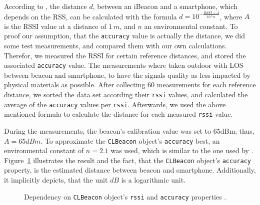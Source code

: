 According to \citet{wang:bt_pos}, the distance $d$, between an iBeacon and a smartphone, which depends on the \acl{RSS}, can be calculated with the formula $d = 10^{-\frac{RSSI + A}{10 * n}}$, where $A$ is the \acs{RSSI} value at a distance of $1~m$, and $n$ an environmental constant. To proof our assumption, that the \texttt{accuracy} value is actually the distance, we did some test measurements, and compared them with our own calculations. Therefor, we measured the \acs{RSSI} for certain reference distances, and stored the associated \texttt{accuracy} value. The measurements where taken outdoor with \ac{LOS} between beacon and smartphone, to have the signals quality as less impacted by physical materials as possible. After collecting 60 measurements for each reference distance, we sorted the data set according their \texttt{rssi} values, and calculated the average of the \texttt{accuracy} values per \texttt{rssi}. Afterwards, we used the above mentioned formula to calculate the distance for each measured \texttt{rssi} value.

During the measurements, the beacon's calibration value was set to 65dBm; thus, $A = 65dBm$. To approximate the \texttt{CLBeacon} object's \texttt{accuracy} best, an environmental constant of $n = 2.1$ was used, which is similar to the one used by \citet{wang:bt_pos}. Figure~\ref{fig:eval_accuracy_vs_distance} illustrates the result and the fact, that the \texttt{CLBeacon} object's \texttt{accuracy} property, is the estimated distance between beacon and smartphone. Additionally, it implicitly depicts, that the unit $dB$ is a logarithmic unit.

\begin{figure}
\caption{Dependency on \texttt{CLBeacon} object's \texttt{rssi} and \texttt{accuracy} properties \citep{apple:ios_doc_cl,wang:bt_pos,kotanen:exp_local_pos_bt}.}
\label{fig:eval_accuracy_vs_distance}
\end{figure}

